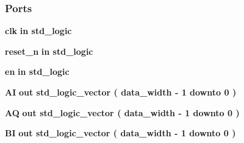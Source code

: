 \subsubsection*{Ports}
 \begin{DoxyCompactItemize}
\item 
{\bf clk}  {\bfseries {\bfseries \textcolor{keywordflow}{in}\textcolor{vhdlchar}{ }}} {\bfseries \textcolor{comment}{std\+\_\+logic}\textcolor{vhdlchar}{ }} 
\item 
{\bf reset\+\_\+n}  {\bfseries {\bfseries \textcolor{keywordflow}{in}\textcolor{vhdlchar}{ }}} {\bfseries \textcolor{comment}{std\+\_\+logic}\textcolor{vhdlchar}{ }} 
\item 
{\bf en}  {\bfseries {\bfseries \textcolor{keywordflow}{in}\textcolor{vhdlchar}{ }}} {\bfseries \textcolor{comment}{std\+\_\+logic}\textcolor{vhdlchar}{ }} 
\item 
{\bf AI}  {\bfseries {\bfseries \textcolor{keywordflow}{out}\textcolor{vhdlchar}{ }}} {\bfseries \textcolor{comment}{std\+\_\+logic\+\_\+vector}\textcolor{vhdlchar}{ }\textcolor{vhdlchar}{(}\textcolor{vhdlchar}{ }\textcolor{vhdlchar}{ }\textcolor{vhdlchar}{ }\textcolor{vhdlchar}{ }{\bfseries {\bf data\+\_\+width}} \textcolor{vhdlchar}{-\/}\textcolor{vhdlchar}{ } \textcolor{vhdldigit}{1} \textcolor{vhdlchar}{ }\textcolor{keywordflow}{downto}\textcolor{vhdlchar}{ }\textcolor{vhdlchar}{ } \textcolor{vhdldigit}{0} \textcolor{vhdlchar}{ }\textcolor{vhdlchar}{)}\textcolor{vhdlchar}{ }} 
\item 
{\bf AQ}  {\bfseries {\bfseries \textcolor{keywordflow}{out}\textcolor{vhdlchar}{ }}} {\bfseries \textcolor{comment}{std\+\_\+logic\+\_\+vector}\textcolor{vhdlchar}{ }\textcolor{vhdlchar}{(}\textcolor{vhdlchar}{ }\textcolor{vhdlchar}{ }\textcolor{vhdlchar}{ }\textcolor{vhdlchar}{ }{\bfseries {\bf data\+\_\+width}} \textcolor{vhdlchar}{-\/}\textcolor{vhdlchar}{ } \textcolor{vhdldigit}{1} \textcolor{vhdlchar}{ }\textcolor{keywordflow}{downto}\textcolor{vhdlchar}{ }\textcolor{vhdlchar}{ } \textcolor{vhdldigit}{0} \textcolor{vhdlchar}{ }\textcolor{vhdlchar}{)}\textcolor{vhdlchar}{ }} 
\item 
{\bf BI}  {\bfseries {\bfseries \textcolor{keywordflow}{out}\textcolor{vhdlchar}{ }}} {\bfseries \textcolor{comment}{std\+\_\+logic\+\_\+vector}\textcolor{vhdlchar}{ }\textcolor{vhdlchar}{(}\textcolor{vhdlchar}{ }\textcolor{vhdlchar}{ }\textcolor{vhdlchar}{ }\textcolor{vhdlchar}{ }{\bfseries {\bf data\+\_\+width}} \textcolor{vhdlchar}{-\/}\textcolor{vhdlchar}{ } \textcolor{vhdldigit}{1} \textcolor{vhdlchar}{ }\textcolor{keywordflow}{downto}\textcolor{vhdlchar}{ }\textcolor{vhdlchar}{ } \textcolor{vhdldigit}{0} \textcolor{vhdlchar}{ }\textcolor{vhdlchar}{)}\textcolor{vhdlchar}{ }} 

\end{DoxyCompactItemize}

